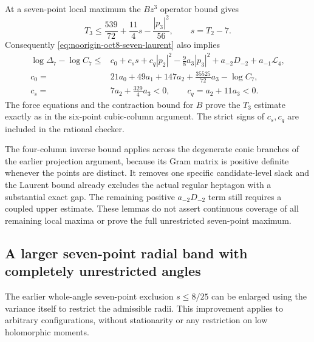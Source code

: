 \documentclass[11pt]{article}
\theoremstyle{remark}
\numberwithin{equation}{section}
\begin{document}
At a seven-point local maximum the $Bz^3$ operator bound gives
\[
 T_3\le\frac{539}{72}+\frac{11}{4}s-\frac{|p_3|^2}{56},
                    \qquad s=T_2-7.
\]
Consequently \eqref{eq:noorigin-oct8-seven-laurent} also implies
\begin{align*}
 \log\Delta_7-\log C_7\le{}&c_0+c_s s+c_q|p_2|^2
       -\frac98a_3|p_3|^2+a_{-2}D_{-2}+a_{-1}\mathcal L_4,\\
 c_0={}&21a_0+49a_1+147a_2+\frac{35525}{72}a_3-\log C_7,\\
 c_s={}&7a_2+\frac{329}{4}a_3<0,\qquad
 c_q=a_2+11a_3<0.
\end{align*}
The force equations and the contraction bound for $B$ prove the
$T_3$ estimate exactly as in the six-point cubic-column argument.
The strict signs of $c_s,c_q$ are included in the rational checker.

The four-column inverse bound applies across the degenerate conic
branches of the earlier projection argument, because its Gram matrix
is positive definite whenever the points are distinct. It removes
one specific candidate-level slack and the Laurent bound already
excludes the actual regular heptagon with a substantial exact gap.
The remaining positive $a_{-2}D_{-2}$ term still requires a coupled
upper estimate. These lemmas do not assert continuous coverage of
all remaining local maxima or prove the full unrestricted seven-point
maximum.

\subsection{A larger seven-point radial band with completely unrestricted angles}
\label{sec:noorigin-oct8-seven-radial}

The earlier whole-angle seven-point exclusion $s\le8/25$ can be
enlarged using the variance itself to restrict the admissible radii.
This improvement applies to arbitrary configurations, without
stationarity or any restriction on low holomorphic moments.
\end{document}
